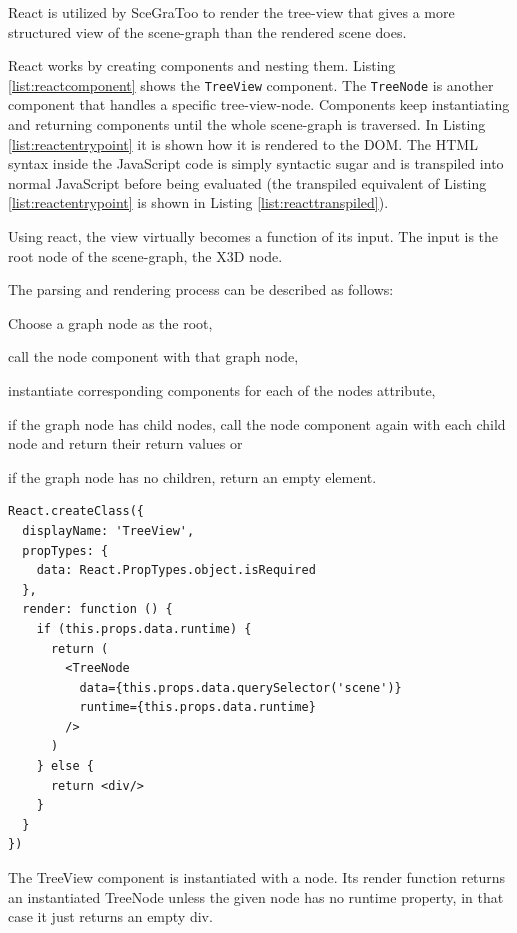 React is utilized by \gls{SceGraToo} to render the tree-view that gives a more
structured view of the scene-graph than the rendered scene does.

React works by creating components and nesting them. Listing
\ref{list:reactcomponent} shows the \texttt{TreeView} component. The
\texttt{TreeNode} is another component that handles a specific tree-view-node.
Components keep instantiating and returning components until the whole
scene-graph is traversed. In Listing \ref{list:reactentrypoint} it is shown how
it is rendered to the \gls{DOM}. The \gls{HTML} syntax inside the JavaScript code is simply syntactic sugar and is
transpiled into normal JavaScript before being evaluated (the transpiled
equivalent of Listing \ref{list:reactentrypoint} is shown in Listing
\ref{list:reacttranspiled}).

Using react, the view virtually becomes a function of its input. The input is the root node of the scene-graph, the \gls{X3D} node.

The parsing and rendering process can be described as follows:
\begin{enumerate*}
  \item Choose a graph node as the root,
  \item call the node component with that graph node,
  \item instantiate corresponding components for each of the nodes attribute,
  \item if the graph node has child nodes, call the node component again with each child node and return their return values or
  \item if the graph node has no children, return an empty element.
\end{enumerate*}

\begin{listing}
  \begin{verbatim}
React.createClass({
  displayName: 'TreeView',
  propTypes: {
    data: React.PropTypes.object.isRequired
  },
  render: function () {
    if (this.props.data.runtime) {
      return (
        <TreeNode
          data={this.props.data.querySelector('scene')}
          runtime={this.props.data.runtime}
        />
      )
    } else {
      return <div/>
    }
  }
})
  \end{verbatim}
  \caption{The TreeView component is instantiated with a node. Its render function returns an instantiated TreeNode unless the given node has no runtime property, in that case it just returns an empty div.}
  \label{list:reactcomponent}
\end{listing}

